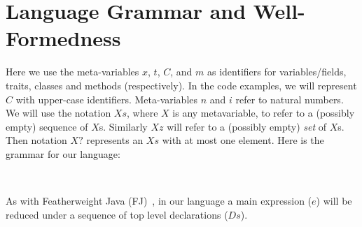 \section{Language Grammar and Well-Formedness}


Here we use the meta-variables $x$, $t$, $C$, and $m$ as identifiers for variables/fields, traits, classes and methods (respectively). In the code examples, we will represent $C$ with upper-case identifiers. Meta-variables $n$ and $i$ refer to natural numbers. We will use the notation $Xs$, where $X$ is any metavariable, to refer to a (possibly empty) sequence of $X$s. Similarly $Xz$ will refer to a (possibly empty) \emph{set} of $X$s. Then notation $X?$ represents an $Xs$ with at most one element. Here is the grammar for our language:

\noindent
\newlength{\gramwidth}
\setlength{\gramwidth}{\dimexpr\textwidth-1em}
\begin{minipage}[t]{0.6\gramwidth}
\begin{grammar}
\end{grammar}
\end{minipage}\hfil
\begin{minipage}[t]{0.4\gramwidth}
\begin{grammar}
	\\
\end{grammar}
\end{minipage}
As with Featherweight Java (FJ)~\cite{?}, in our language a main expression ($e$) will be reduced under a sequence of top level declarations ($Ds$).


